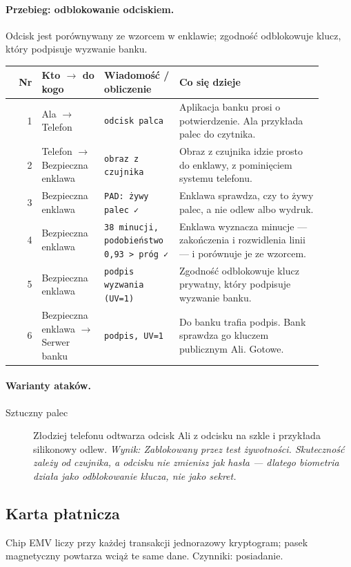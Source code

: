\paragraph{Przebieg: odblokowanie odciskiem.} Odcisk jest porównywany ze wzorcem w enklawie; zgodność odblokowuje klucz, który podpisuje wyzwanie banku.
\begingroup\footnotesize
\begin{longtable}{@{}r p{0.2\linewidth} p{0.24\linewidth} p{0.46\linewidth}@{}}
\toprule
Nr & Kto $\rightarrow$ do kogo & Wiadomość / obliczenie & Co się dzieje \\
\midrule
\endhead
1 & Ala $\rightarrow$ Telefon & \texttt{odcisk palca} & Aplikacja banku prosi o potwierdzenie. Ala przykłada palec do czytnika. \\
2 & Telefon $\rightarrow$ Bezpieczna enklawa & \texttt{obraz z czujnika} & Obraz z czujnika idzie prosto do enklawy, z pominięciem systemu telefonu. \\
3 & Bezpieczna enklawa & \texttt{PAD: żywy palec ✓} & Enklawa sprawdza, czy to żywy palec, a nie odlew albo wydruk. \\
4 & Bezpieczna enklawa & \texttt{38 minucji, podobieństwo 0,93 > próg ✓} & Enklawa wyznacza minucje — zakończenia i rozwidlenia linii — i porównuje je ze wzorcem. \\
5 & Bezpieczna enklawa & \texttt{podpis wyzwania (UV=1)} & Zgodność odblokowuje klucz prywatny, który podpisuje wyzwanie banku. \\
6 & Bezpieczna enklawa $\rightarrow$ Serwer banku & \texttt{podpis, UV=1} & Do banku trafia podpis. Bank sprawdza go kluczem publicznym Ali. Gotowe. \\
\bottomrule
\end{longtable}
\endgroup

\paragraph{Warianty ataków.}
\begin{description}
\item[Sztuczny palec] Złodziej telefonu odtwarza odcisk Ali z odcisku na szkle i przykłada silikonowy odlew. \emph{Wynik: Zablokowany przez test żywotności. Skuteczność zależy od czujnika, a odcisku nie zmienisz jak hasła — dlatego biometria działa jako odblokowanie klucza, nie jako sekret.}
\end{description}

\subsection{Karta płatnicza}
\label{sec:mech-karta}
Chip EMV liczy przy każdej transakcji jednorazowy kryptogram; pasek magnetyczny powtarza wciąż te same dane. Czynniki: posiadanie. \cite{S5,A4,A5,A6,A7,A8,A9,X6,N3}

